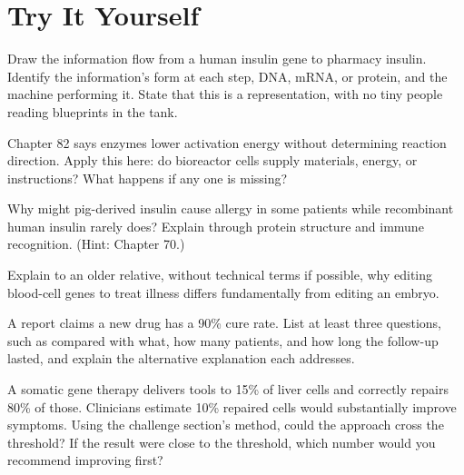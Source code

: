\section*{Try It Yourself}

\begin{sikaoti}
\item Draw the information flow from a human insulin gene to pharmacy insulin. Identify the information's form at each step, DNA, mRNA, or protein, and the machine performing it. State that this is a representation, with no tiny people reading blueprints in the tank.
\item Chapter 82 says enzymes lower activation energy without determining reaction direction. Apply this here: do bioreactor cells supply materials, energy, or instructions? What happens if any one is missing?
\item Why might pig-derived insulin cause allergy in some patients while recombinant human insulin rarely does? Explain through protein structure and immune recognition. (Hint: Chapter 70.)
\item Explain to an older relative, without technical terms if possible, why editing blood-cell genes to treat illness differs fundamentally from editing an embryo.
\item A report claims a new drug has a 90\% cure rate. List at least three questions, such as compared with what, how many patients, and how long the follow-up lasted, and explain the alternative explanation each addresses.
\item A somatic gene therapy delivers tools to 15\% of liver cells and correctly repairs 80\% of those. Clinicians estimate 10\% repaired cells would substantially improve symptoms. Using the challenge section's method, could the approach cross the threshold? If the result were close to the threshold, which number would you recommend improving first?
\end{sikaoti}
